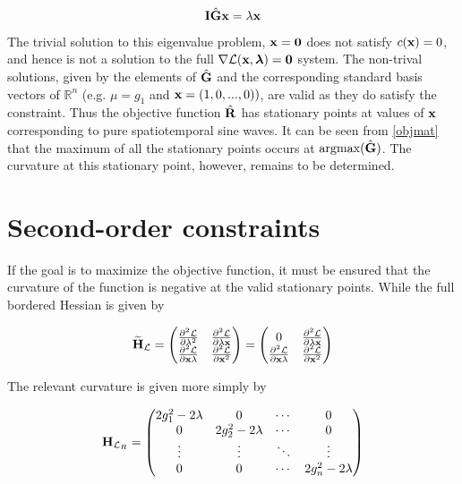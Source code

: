\documentclass{article}
\newcommand{\Lagr}{\mathcal{L}}
\newcommand{\R}{\mathbb{R}}
\newcommand{\vect}[1]{\textbf{\textrm{#1}}}
\newcommand{\pdd}[2]{\frac{\partial^2 {#1}}{\partial {#2}}}
\begin{document}
\begin{equation}
	\vect{I} \hat{\vect{G}} \vect{x} = \lambda \vect{x}
\end{equation}

The trivial solution to this eigenvalue problem, $\vect{x} = \vect{0}$ does not satisfy $c(\vect{x}) = 0$, and hence is not a solution to the full $\nabla \Lagr(\vect{x},\bm{\lambda}) = \vect{0}$ system.
The non-trival solutions, given by the elements of $\hat{\vect{G}}$ and the corresponding standard basis vectors of $\R^n$ (e.g. $\mu = g_1$ and $\vect{x} = (1, 0, ..., 0))$, are valid as they do satisfy the constraint. 
Thus the objective function $\hat{\vect{R}}$ has stationary points at values of $\vect{x}$ corresponding to pure spatiotemporal sine waves.
It can be seen from \eqref{objmat} that the maximum of all the stationary points occurs at $\text{argmax}(\hat{\vect{G}})$.
The curvature at this stationary point, however, remains to be determined.


\section{Second-order constraints} \label{soc}
If the goal is to maximize the objective function, it must be ensured that the curvature of the function is negative at the valid stationary points. While the full bordered Hessian is given by

\begin{equation} \label{lagrhessian}
	\widetilde{\vect{H}}_\Lagr = 
	\begin{pmatrix}
		\pdd{\Lagr}{\lambda^2} & \pdd{\Lagr}{\lambda\vect{x}} \\
		\pdd{\Lagr}{\vect{x}\lambda} & \pdd{\Lagr}{\vect{x}^2}
	\end{pmatrix} = 
	\begin{pmatrix}
		0 & \pdd{\Lagr}{\lambda\vect{x}} \\
		\pdd{\Lagr}{\vect{x}\lambda} & \pdd{\Lagr}{\vect{x}^2}
	\end{pmatrix}
\end{equation}

The relevant curvature is given more simply by

\begin{equation}
	\vect{H}_{\Lagr_R} =
	\begin{pmatrix}
		2g_1^2 - 2\lambda & 0 & \cdots & 0 \\
		0 & 2g_2^2 - 2\lambda & \cdots & 0 \\
		\vdots & \vdots & \ddots & \vdots \\
		0 & 0 & \cdots & 2g_n^2 - 2\lambda
	\end{pmatrix} \nonumber
\end{equation}
\end{document}
